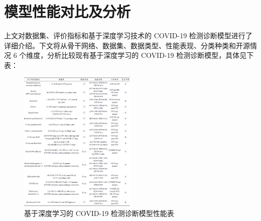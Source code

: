 \documentclass[journal,twoside,web]{ieeecolor}
\begin{document}
\section{模型性能对比及分析}
上文对数据集、评价指标和基于深度学习技术的 COVID-19 检测诊断模型进行了详细介绍。下文将从骨干网络、数据集、数据类型、性能表现、分类种类和开源情况 6 个维度，分析比较现有基于深度学习的 COVID-19 检测诊断模型，具体见下表：
\begin{figure}[h]
\centering
\includegraphics[width=0.5\textwidth]{img/fig1.jpg}
\caption{基于深度学习的 COVID-19 检测诊断模型性能表}
\label{fig:COVID-19_classification_and_segmentation_performance}
\end{figure}
\end{document}
